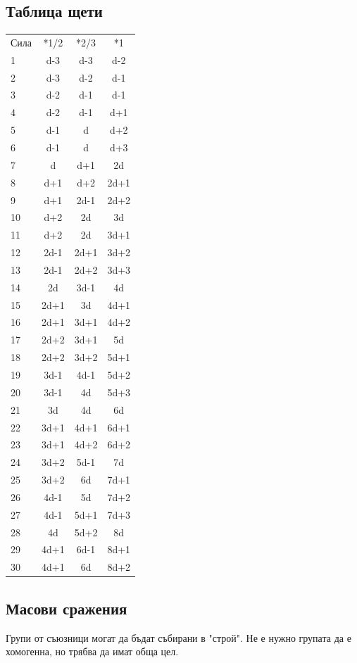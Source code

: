 \subsection{Таблица щети}
\begin{tabular}{l | c | c | c}
Сила & *1/2 & *2/3 & *1  \\
1  & d-3  & d-3  & d-2   \\
2  & d-3  & d-2  & d-1   \\
3  & d-2  & d-1  & d-1   \\
4  & d-2  & d-1  & d+1   \\
5  & d-1  & d    & d+2   \\
6  & d-1  & d    & d+3   \\
7  & d    & d+1  & 2d    \\
8  & d+1  & d+2  & 2d+1  \\
9  & d+1  & 2d-1 & 2d+2  \\
10 & d+2  & 2d   & 3d    \\
11 & d+2  & 2d   & 3d+1  \\
12 & 2d-1 & 2d+1 & 3d+2  \\
13 & 2d-1 & 2d+2 & 3d+3  \\
14 & 2d   & 3d-1 & 4d    \\
15 & 2d+1 & 3d   & 4d+1  \\
16 & 2d+1 & 3d+1 & 4d+2  \\
17 & 2d+2 & 3d+1 & 5d    \\
18 & 2d+2 & 3d+2 & 5d+1  \\
19 & 3d-1 & 4d-1 & 5d+2  \\
20 & 3d-1 & 4d   & 5d+3  \\
21 & 3d   & 4d   & 6d    \\
22 & 3d+1 & 4d+1 & 6d+1  \\
23 & 3d+1 & 4d+2 & 6d+2  \\
24 & 3d+2 & 5d-1 & 7d    \\
25 & 3d+2 & 6d   & 7d+1  \\
26 & 4d-1 & 5d   & 7d+2  \\
27 & 4d-1 & 5d+1 & 7d+3  \\
28 & 4d   & 5d+2 & 8d    \\
29 & 4d+1 & 6d-1 & 8d+1  \\
30 & 4d+1 & 6d   & 8d+2
\end{tabular}

\subsection{Масови сражения}
Групи от съюзници могат да бъдат събирани в "строй".
Не е нужно групата да е хомогенна, но трябва да имат обща цел.

